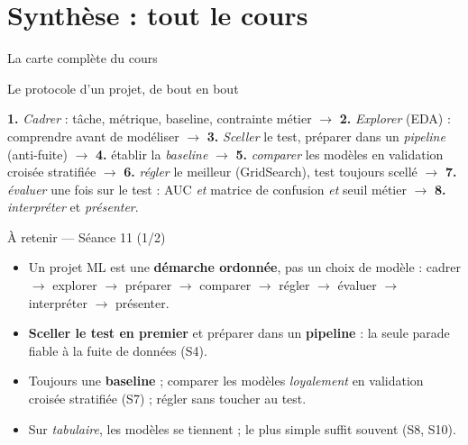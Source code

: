 \documentclass[aspectratio=169,11pt]{beamer}
\begin{document}
\section{Synthèse : tout le cours}

\begin{frame}{La carte complète du cours}
\end{frame}

\begin{frame}{Le protocole d'un projet, de bout en bout}
\begin{ucadret}
{\small \textbf{1.} \emph{Cadrer} : tâche, métrique, baseline, contrainte métier $\to$ \textbf{2.} \emph{Explorer} (EDA) : comprendre avant de modéliser $\to$ \textbf{3.} \emph{Sceller} le test, préparer dans un \emph{pipeline} (anti-fuite) $\to$ \textbf{4.} établir la \emph{baseline} $\to$ \textbf{5.} \emph{comparer} les modèles en validation croisée stratifiée $\to$ \textbf{6.} \emph{régler} le meilleur (GridSearch), test toujours scellé $\to$ \textbf{7.} \emph{évaluer} une fois sur le test : AUC \emph{et} matrice de confusion \emph{et} seuil métier $\to$ \textbf{8.} \emph{interpréter} et \emph{présenter}.}
\end{ucadret}
\end{frame}

\begin{frame}{À retenir — Séance 11 (1/2)}
\begin{ucadret}[La démarche]
\begin{itemize}\small
  \item Un projet ML est une \textbf{démarche ordonnée}, pas un choix de modèle : cadrer $\to$ explorer $\to$ préparer $\to$ comparer $\to$ régler $\to$ évaluer $\to$ interpréter $\to$ présenter.
  \item \textbf{Sceller le test en premier} et préparer dans un \textbf{pipeline} : la seule parade fiable à la fuite de données (S4).
  \item Toujours une \textbf{baseline} ; comparer les modèles \emph{loyalement} en validation croisée stratifiée (S7) ; régler sans toucher au test.
  \item Sur \emph{tabulaire}, les modèles se tiennent ; le plus simple suffit souvent (S8, S10).
\end{itemize}
\end{ucadret}
\end{frame}
\end{document}
